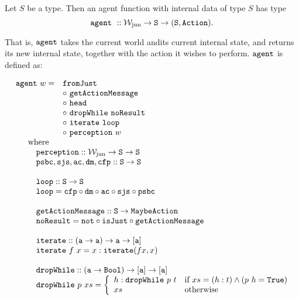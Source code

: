 \begin{definition}
	Let $S$ be a type. Then an agent function with internal data of type $S$ has type
	$$
		\mathtt{agent}\ :: \mathtt{\mathcal{W}_{\mathrm{jun}} \rightarrow S \rightarrow (S, Action)}.
	$$
	
	That is, $\mathtt{agent}$ takes the current world andits current internal state, and returns its new internal state, together with the action it wishes to perform. $\mathtt{agent}$ is defined as:
	
	$$
		\begin{array}{l}
			\begin{array}{l l}
				\field{agent}\ w = & \field{fromJust}\\
								   & \circ\ \field{getActionMessage}\\
								   & \circ\ \field{head}\\
								   & \circ\ \field{dropWhile}\ \field{noResult}\\
								   & \circ\ \field{iterate}\ \field{loop}\\
								   & \circ\ \field{perception}\ w\\
			\end{array}\\
			\quad \quad \mt{where}\\
			\quad \quad \quad \field{perception} :: \type{\wjun \rightarrow S \rightarrow S}\\
			\quad \quad \quad \field{psbc}, \field{sjs}, \field{ac}, \field{dm}, \field{cfp} :: \type{S \rightarrow S}\\
			\\
			\quad \quad \quad \field{loop} :: \type{S \rightarrow S}\\
			\quad \quad \quad \field{loop} = \field{cfp} \circ \field{dm} \circ \field{ac} \circ \field{sjs} \circ \field{psbc}\\
			\\
			\quad \quad \quad \field{getActionMessage} :: \type{S \rightarrow Maybe Action}\\
			\quad \quad \quad \field{noResult} = \field{not} \circ \field{isJust} \circ \field{getActionMessage}\\
			\\
			\quad \quad \quad \field{iterate} :: \type{(a \rightarrow a) \rightarrow a \rightarrow [a]}\\
			\quad \quad \quad \field{iterate}\ f\ x = x : \field{iterate}(f x,x)\\
			\\
			\quad \quad \quad \field{dropWhile} :: \type{(a \rightarrow Bool) \rightarrow [a] \rightarrow [a]}\\
			\quad \quad \quad \field{dropWhile}\ p\ xs  = \left\{
				\begin{array}{l l}
					h : \field{dropWhile}\ p\ t & \mt{if } xs = (h:t) \wedge (p\ h = \type{True})\\
					xs & \mt{otherwise}\\
				\end{array}
			\right.\\
		\end{array}
	$$
	

\end{definition}

